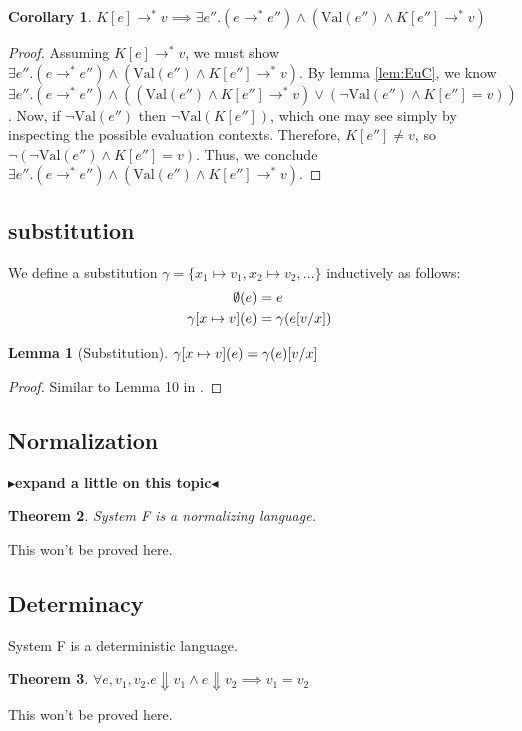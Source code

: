 \documentclass[twoside,11pt,openright]{report}
\newtheorem{theorem}{Theorem}
\newtheorem{corollary}{Corollary}[theorem]
\newtheorem{lemma}[theorem]{Lemma}
\theoremstyle{definition}
\newcommand{\var}{x}
\newcommand{\expr}{e}
\newcommand{\val}{v}
\newcommand{\elctx}{K}
\newcommand{\subst}[3]{#1{\left[#3 \middle/ #2 \right]}}
\newcommand{\stepS}{\rightarrow^*}
\newcommand{\Val}[1]{\mathrm{Val}(#1)}
\newcommand{\map}[2]{#1 \mapsto #2}
\newcommand{\todo}[1]{{\color[rgb]{.5,0,0}\textbf{$\blacktriangleright$#1$\blacktriangleleft$}}}
\begin{document}
\begin{corollary}\label{cor:EuC_val}
  $\elctx[\expr] \stepS \val \implies \exists \expr'' . (\expr \stepS \expr'') \land (\Val{\expr''} \land \elctx[\expr''] \stepS \val)$
\end{corollary}
\begin{proof}
  Assuming $\elctx[\expr] \stepS \val$, we must show $\exists \expr'' . (\expr \stepS \expr'') \land (\Val{\expr''} \land \elctx[\expr''] \stepS \val)$.
  By lemma \ref*{lem:EuC}, we know $\exists \expr'' . (\expr \stepS \expr'') \land ((\Val{\expr''} \land \elctx[\expr''] \stepS \val) \lor
  (\neg \Val{\expr''} \land \elctx[\expr''] = \val))$. Now, if $\neg \Val{\expr''}$ then $\neg \Val{\elctx[\expr'']}$, which one may see simply by inspecting the possible evaluation contexts. Therefore, $\elctx[\expr''] \neq \val$, so $\neg(\neg \Val{\expr''} \land \elctx[\expr''] = \val)$. Thus, we conclude $\exists \expr'' . (\expr \stepS \expr'') \land (\Val{\expr''} \land \elctx[\expr''] \stepS \val)$.
\end{proof}

\subsection{substitution}
We define a substitution $\gamma = \{\map{\var_1}{\val_1}, \map{\var_2}{\val_2}, \dots\}$ inductively as follows:
\begin{align*}
  \emptyset(\expr) &= \expr\\
  \gamma[\map{\var}{\val}](\expr) &= \gamma(\subst{\expr}{\var}{\val})
\end{align*}

\begin{lemma}[Substitution]\label{lem:sub}
  $\gamma[\map{\var}{\val}](\expr) = \subst{\gamma(\expr)}{\var}{\val}$
\end{lemma}
\begin{proof}
  Similar to Lemma 10 in \cite{DBLP:journals/corr/abs-1907-11133}.
\end{proof}

\subsection{Normalization}
\todo{expand a little on this topic}
\begin{theorem}\label{thm:norm}
  System F is a normalizing language.
\end{theorem}
This won't be proved here.

\subsection{Determinacy}
System F is a deterministic language.
\begin{theorem}\label{thm:determinacy}
  $\forall \expr, \val_1, \val_2 . \expr \Downarrow \val_1 \land \expr \Downarrow \val_2 \implies \val_1 = \val_2$
\end{theorem}
This won't be proved here.
\end{document}
